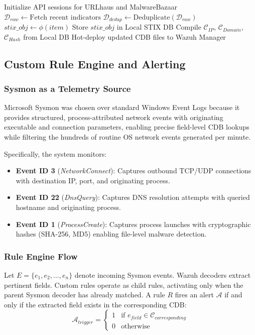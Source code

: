 \documentclass[conference]{IEEEtran}
\begin{document}
\begin{algorithm}
\caption{Asynchronous Threat Ingestion \& CDB Generation}\label{alg:ingestion}
\begin{algorithmic}[1]
\STATE Initialize API sessions for URLhaus and MalwareBazaar
    \STATE $\mathcal{D}_{raw} \leftarrow \text{Fetch recent indicators}$
    \STATE $\mathcal{D}_{dedup} \leftarrow \text{Deduplicate}(\mathcal{D}_{raw})$
        \STATE $stix\_obj \leftarrow \phi(item)$
        \STATE Store $stix\_obj$ in Local STIX DB
    \ENDFOR
    \STATE Compile $\mathcal{C}_{IP}$, $\mathcal{C}_{Domain}$, $\mathcal{C}_{Hash}$ from Local DB
    \STATE Hot-deploy updated CDB files to Wazuh Manager
\ENDWHILE
\end{algorithmic}
\end{algorithm}

\subsection{Custom Rule Engine and Alerting}

\subsubsection{Sysmon as a Telemetry Source}
Microsoft Sysmon was chosen over standard Windows Event Logs because it provides structured, process-attributed network events with originating executable and connection parameters, enabling precise field-level CDB lookups while filtering the hundreds of routine OS network events generated per minute.

Specifically, the system monitors:
\begin{itemize}
    \item \textbf{Event ID 3} (\textit{NetworkConnect}): Captures outbound TCP/UDP connections with destination IP, port, and originating process.
    \item \textbf{Event ID 22} (\textit{DnsQuery}): Captures DNS resolution attempts with queried hostname and originating process.
    \item \textbf{Event ID 1} (\textit{ProcessCreate}): Captures process launches with cryptographic hashes (SHA-256, MD5) enabling file-level malware detection.
\end{itemize}

\subsubsection{Rule Engine Flow}
Let $E = \{e_1, e_2, ..., e_n\}$ denote incoming Sysmon events. Wazuh decoders extract pertinent fields. Custom rules operate as child rules, activating only when the parent Sysmon decoder has already matched. A rule $R$ fires an alert $\mathcal{A}$ if and only if the extracted field exists in the corresponding CDB:
\begin{equation}
\mathcal{A}_{trigger} =
\begin{cases}
1 & \text{if } e_{field} \in \mathcal{C}_{corresponding} \\
0 & \text{otherwise}
\end{cases}
\end{equation}
\end{document}
